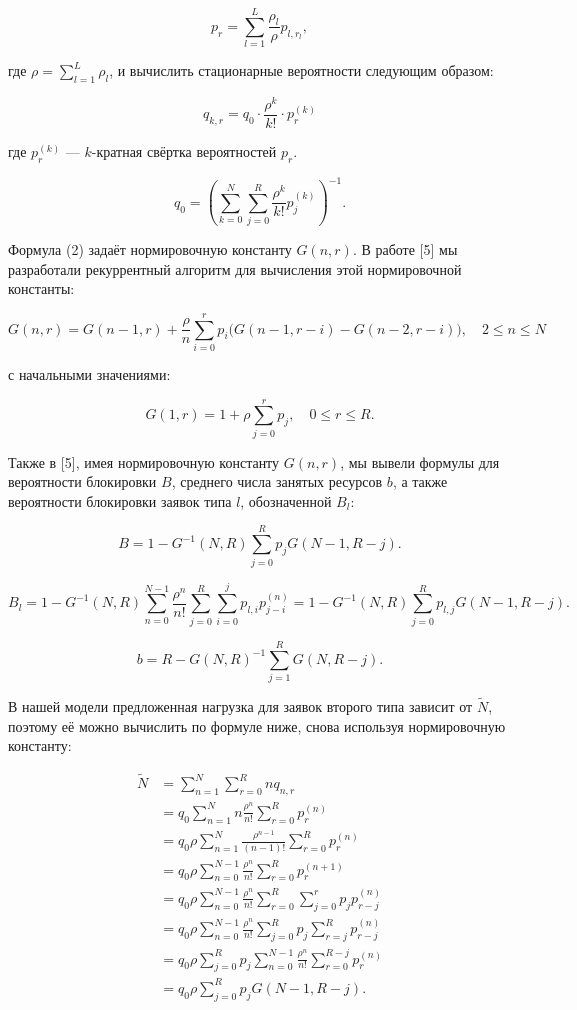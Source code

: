 \[
p_r = \sum_{l=1}^L \frac{\rho_l}{\rho} p_{l,r_l},
\]

где \(\rho = \sum_{l=1}^L \rho_l\), и вычислить стационарные вероятности
следующим образом:

\[
q_{k,r} = q_0 \cdot \frac{\rho^k}{k!} \cdot p_r^{(k)} \tag{1}
\]

где \(p_r^{(k)}\) --- \(k\)-кратная свёртка вероятностей \(p_r\).

\[
q_0 = \left( \sum_{k=0}^N \sum_{j=0}^R \frac{\rho^k}{k!} p_j^{(k)} \right)^{-1}. \tag{2}
\]

Формула (2) задаёт нормировочную константу \(G(n, r)\). В работе {[}5{]}
мы разработали рекуррентный алгоритм для вычисления этой нормировочной
константы:

\[
G(n, r) = G(n-1, r) + \frac{\rho}{n} \sum_{i=0}^r p_i \bigl( G(n-1, r-i) - G(n-2, r-i) \bigr), \quad 2 \le n \le N \tag{3}
\]

с начальными значениями:

\[
G(1, r) = 1 + \rho \sum_{j=0}^r p_j, \quad 0 \le r \le R. \tag{4}
\]

Также в {[}5{]}, имея нормировочную константу \(G(n, r)\), мы вывели
формулы для вероятности блокировки \(B\), среднего числа занятых
ресурсов \(b\), а также вероятности блокировки заявок типа \(l\),
обозначенной \(B_l\):

\[
B = 1 - G^{-1}(N, R) \sum_{j=0}^R p_j G(N-1, R-j). \tag{5}
\]

\[
B_l = 1 - G^{-1}(N, R) \sum_{n=0}^{N-1} \frac{\rho^n}{n!} \sum_{j=0}^R \sum_{i=0}^j p_{l,i} p_{j-i}^{(n)} = 1 - G^{-1}(N, R) \sum_{j=0}^R p_{l,j} G(N-1, R-j). \tag{6}
\]

\[
b = R - G(N, R)^{-1} \sum_{j=1}^R G(N, R-j). \tag{7}
\]

В нашей модели предложенная нагрузка для заявок второго типа зависит от
\(\tilde{N}\), поэтому её можно вычислить по формуле ниже, снова
используя нормировочную константу:

\[
\begin{aligned}
\tilde{N} &= \sum_{n=1}^N \sum_{r=0}^R n q_{n,r} \\
&= q_0 \sum_{n=1}^N n \frac{\rho^n}{n!} \sum_{r=0}^R p_r^{(n)} \\
&= q_0 \rho \sum_{n=1}^N \frac{\rho^{n-1}}{(n-1)!} \sum_{r=0}^R p_r^{(n)} \\
&= q_0 \rho \sum_{n=0}^{N-1} \frac{\rho^n}{n!} \sum_{r=0}^R p_r^{(n+1)} \\
&= q_0 \rho \sum_{n=0}^{N-1} \frac{\rho^n}{n!} \sum_{r=0}^R \sum_{j=0}^r p_j p_{r-j}^{(n)} \\
&= q_0 \rho \sum_{n=0}^{N-1} \frac{\rho^n}{n!} \sum_{j=0}^R p_j \sum_{r=j}^R p_{r-j}^{(n)} \\
&= q_0 \rho \sum_{j=0}^R p_j \sum_{n=0}^{N-1} \frac{\rho^n}{n!} \sum_{r=0}^{R-j} p_r^{(n)} \\
&= q_0 \rho \sum_{j=0}^R p_j G(N-1, R-j). \tag{8}
\end{aligned}
\]

